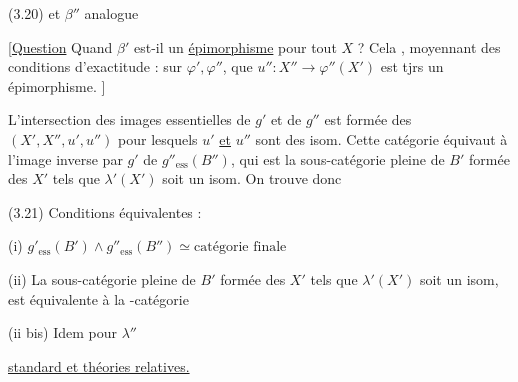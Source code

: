 (3.20)
et $\beta''$ analogue

[\uline{Question} Quand $\beta'$ est-il un \uline{épimorphisme} pour tout $X$ ? Cela  , moyennant des conditions d'exactitude :   sur $\varphi',\varphi''$, que $u'':X''\longrightarrow\varphi''(X')$ est tjrs un épimorphisme. ]

L'intersection des images essentielles de $g'$ et de $g''$ est formée des $(X',X'',u',u'')$ pour lesquels $u'$ \uline{et} $u''$ sont des isom.  Cette catégorie équivaut à l'image inverse par $g'$ de $g''_{\mathrm{ess}}(B'')$, qui est la sous-catégorie  pleine de $B'$ formée des $X'$ tels que $\lambda'(X')$ soit un isom. On trouve donc

(3.21) Conditions équivalentes :

(i) $g'_{\mathrm{ess}}(B')\wedge g''_{\mathrm{ess}}(B'')\simeq\text{catégorie finale}$

(ii) La sous-catégorie pleine de $B'$ formée des $X'$ tels que $\lambda'(X')$ soit un isom, est équivalente à la -catégorie 

(ii bis) Idem pour $\lambda''$

\uline{ standard et théories relatives.}

